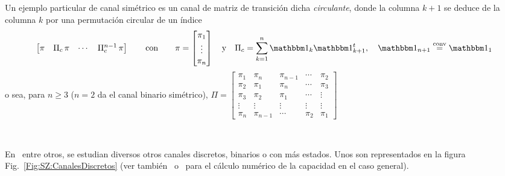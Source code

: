 {Un ejemplo particular de canal sim\'etrico es un canal de matriz de transici\'on
dicha {\em circulante}, donde la columna $k+1$ se deduce de la columna $k$ por una permutaci\'on circular de un \'indice
%
\[
\begin{bmatrix}
\pi & \Pi_c \, \pi & \cdots & \Pi_c^{n-1} \, \pi
\end{bmatrix} \qquad \mbox{con} \qquad
%
\pi = \begin{bmatrix} \pi_1 \\ \vdots \\ \pi_n \end{bmatrix}
\quad \mbox{y} \quad
\Pi_c =
\sum_{k=1}^n \uno_k \uno_{k+1}^t, \quad \uno_{n+1} \igualc \uno_1
\]
%
o sea, para $n \ge 3$ ($n = 2$ da el canal binario sim\'etrico),
%
$\Pi  =  \begin{bmatrix}
  \pi_1   &   \pi_n  & \pi_{n-1} & \cdots & \pi_2 \\
%
  \pi_2   &   \pi_1  &   \pi_n  & \cdots & \pi_3\\
%
  \pi_3   &   \pi_2  &   \pi_1  & \cdots & \vdots\\
%
 \vdots & \vdots & \vdots & \vdots & \vdots\\
%
  \pi_n   & \pi_{n-1} & \cdots & \pi_2 & \pi_1
\end{bmatrix}
$
%
}

\

En~\cite{CovTho06,  Rio07}  entre  otros,  se estudian  diversos  otros  canales
discretos, binarios  o con m\'as estados.   Unos son representados  en la figura
Fig.~\ref{Fig:SZ:CanalesDiscretos}     (ver     tambi\'en~\cite{Sha48,    Eli57}
o~\cite{Ari72} para el c\'alculo num\'erico de la capacidad en el caso general).



